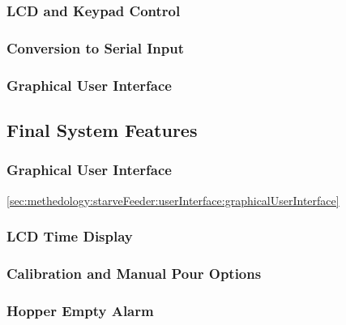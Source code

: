 \subsubsection{LCD and Keypad Control\label{sec:methedology:starveFeeder:userInterface:lcdAndKeypadControl}}

\subsubsection{Conversion to Serial Input\label{sec:methedology:starveFeeder:userInterface:conversionToSerialInput}}

\subsubsection{Graphical User Interface\label{sec:methedology:starveFeeder:userInterface:graphicalUserInterface}}

\subsection{Final System Features\label{sec:methedology:starveFeeder:finalSystemFeatures}}

\subsubsection{Graphical User Interface\label{sec:methedology:starveFeeder:finalSystemFeatures:graphicalUserInterface}}
\ref{sec:methedology:starveFeeder:userInterface:graphicalUserInterface}

\subsubsection{LCD Time Display\label{sec:methedology:starveFeeder:finalSystemFeatures:lcdTimeDisplay}}

\subsubsection{Calibration and Manual Pour Options\label{sec:methedology:starveFeeder:finalSystemFeatures:calibrationAndManualPourOptions}}

\subsubsection{Hopper Empty Alarm\label{sec:methedology:starveFeeder:finalSystemFeatures:hopperEmptyAlarm}}

